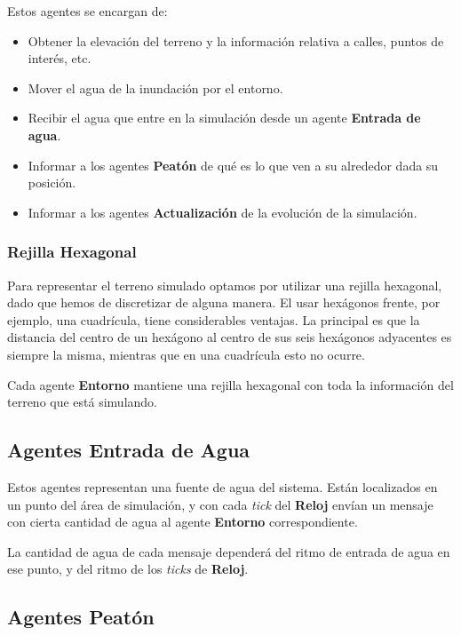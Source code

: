 Estos agentes se encargan de:

\begin{itemize}
 \item Obtener la elevación del terreno y la información relativa a calles,
puntos de interés, etc.
 \item Mover el agua de la inundación por el entorno.
 \item Recibir el agua que entre en la simulación desde un agente {\bf Entrada
de agua}.
 \item Informar a los agentes {\bf Peatón} de qué es lo que ven a su alrededor
dada su posición.
 \item Informar a los agentes {\bf Actualización} de la evolución de la
simulación.
\end{itemize}

\subsubsection*{Rejilla Hexagonal}

Para representar el terreno simulado optamos por utilizar una rejilla
hexagonal, dado que hemos de discretizar de alguna manera. El usar hexágonos
frente, por ejemplo, una cuadrícula, tiene considerables ventajas. La principal
es que la distancia del centro de un hexágono al centro de sus seis hexágonos
adyacentes es siempre la misma, mientras que en una cuadrícula esto no ocurre.


Cada agente {\bf Entorno} mantiene una rejilla hexagonal con toda la
información del terreno que está simulando.

\subsection*{Agentes Entrada de Agua}

Estos agentes representan una fuente de agua del sistema. Están localizados en
un punto del área de simulación, y con cada {\em tick} del {\bf Reloj} envían
un mensaje con cierta cantidad de agua al agente {\bf Entorno} correspondiente.

La cantidad de agua de cada mensaje dependerá del ritmo de entrada de agua en
ese punto, y del ritmo de los {\em ticks} de {\bf Reloj}.

\subsection*{Agentes Peatón}

